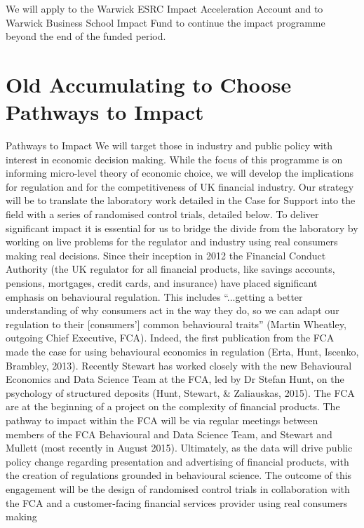 \documentclass[11pt, a4paper]{article}
\begin{document}
We will apply to the Warwick ESRC Impact Acceleration Account and to Warwick Business School Impact Fund to continue the impact programme beyond the end of the funded period. 





\section{Old Accumulating to Choose Pathways to Impact}

Pathways to Impact
We will target those in industry and public policy with interest in economic decision making.
While the focus of this programme is on informing micro-level theory of economic choice,
we will develop the implications for regulation and for the competitiveness of UK financial
industry. Our strategy will be to translate the laboratory work detailed in the Case for Support
into the field with a series of randomised control trials, detailed below. To deliver significant
impact it is essential for us to bridge the divide from the laboratory by working on live
problems for the regulator and industry using real consumers making real decisions.
Since their inception in 2012 the Financial Conduct Authority (the UK regulator for all
financial products, like savings accounts, pensions, mortgages, credit cards, and insurance)
have placed significant emphasis on behavioural regulation. This includes “...getting a better
understanding of why consumers act in the way they do, so we can adapt our regulation to
their [consumers’] common behavioural traits” (Martin Wheatley, outgoing Chief Executive,
FCA). Indeed, the first publication from the FCA made the case for using behavioural
economics in regulation (Erta, Hunt, Iscenko, Brambley, 2013). Recently Stewart has worked
closely with the new Behavioural Economics and Data Science Team at the FCA, led by Dr
Stefan Hunt, on the psychology of structured deposits (Hunt, Stewart, \& Zaliauskas, 2015).
The FCA are at the beginning of a project on the complexity of financial products. The
pathway to impact within the FCA will be via regular meetings between members of the FCA
Behavioural and Data Science Team, and Stewart and Mullett (most recently in August 2015).
Ultimately, as the data will drive public policy change regarding presentation and advertising
of financial products, with the creation of regulations grounded in behavioural science. The
outcome of this engagement will be the design of randomised control trials in collaboration
with the FCA and a customer-facing financial services provider using real consumers making
\end{document}
